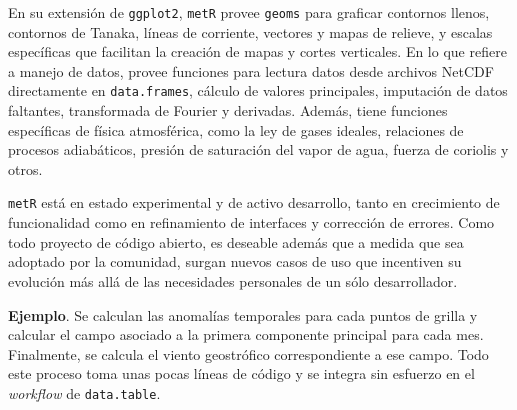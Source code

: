 \documentclass[runningheads]{llncs}\usepackage{knitr}
\newcommand{\mytilde}{\lower.80ex\hbox{\char`\~}\xspace}
\begin{document}
En su extensión de \texttt{ggplot2}, \texttt{metR} provee \texttt{geoms} para graficar contornos llenos, contornos de Tanaka, líneas de corriente, vectores y mapas de relieve, y escalas específicas que facilitan la creación de mapas y cortes verticales. En lo que refiere a manejo de datos, provee funciones para lectura datos desde archivos NetCDF directamente en \texttt{data.frames}, cálculo de valores principales, imputación de datos faltantes, transformada de Fourier y derivadas. Además, tiene funciones específicas de física atmosférica, como la ley de gases ideales, relaciones de procesos adiabáticos, presión de saturación del vapor de agua, fuerza de coriolis y otros.

\texttt{metR} está en estado experimental y de activo desarrollo, tanto en crecimiento de funcionalidad como en refinamiento de interfaces y corrección de errores. Como todo proyecto de código abierto, es deseable además que a medida que sea adoptado por la comunidad, surgan nuevos casos de uso que incentiven su evolución más allá de las necesidades personales de un sólo desarrollador.

\textbf{Ejemplo}. Se calculan las anomalías temporales para cada puntos de grilla y calcular el campo asociado a la primera componente principal para cada mes. Finalmente, se calcula el viento geostrófico correspondiente a ese campo. Todo este proceso toma unas pocas líneas de código y se integra sin esfuerzo en el \emph{workflow} de \texttt{data.table}. 

\begin{knitrout}
\color{fgcolor}\begin{kframe}
\begin{alltt}
\hlstd{geopotential[, gh.t} \hlkwb{:=}   \hlstd{=}  \hlstd{(date))]}
\hlstd{geopotential[, gh.t.w} \hlkwb{:=} \hlopt{*}\hlstd{(}\hlopt{*}\hlopt{/}\hlstd{))]}
 \hlkwb{<-} \hlstd{geopotential[,}  \hlopt{\mytilde}  \hlopt{|}  \hlopt{+}   \hlstd{=} \hlstd{)}\hlopt{$}
                     \hlstd{=} \hlstd{(date)]}
\hlstd{eof[,} \hlstd{(}\hlstd{,} \hlstd{)} \hlkwb{:=}   \hlstd{= month]}
\end{alltt}
\end{kframe}
\end{knitrout}
\end{document}
